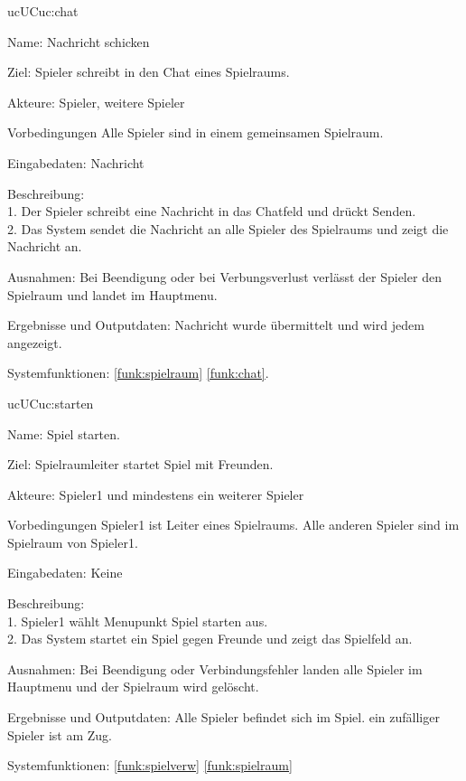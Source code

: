 \begin{description}[leftmargin=5em, style=sameline]
	\begin{lhp}{uc}{UC}{uc:chat}
		\item [Name:] Nachricht schicken
		\item [Ziel:] Spieler schreibt in den Chat eines Spielraums.
		\item [Akteure:] Spieler, weitere Spieler
		\item [Vorbedingungen] Alle Spieler sind in einem gemeinsamen Spielraum.
		\item [Eingabedaten:] Nachricht
		\item [Beschreibung:] \hfill\\
			1. Der Spieler schreibt eine Nachricht in das Chatfeld und drückt Senden.\\
			2. Das System sendet die Nachricht an alle Spieler des Spielraums und zeigt die Nachricht an.\\
		\item [Ausnahmen:] Bei Beendigung oder bei Verbungsverlust verlässt der Spieler den Spielraum und landet im Hauptmenu.
		\item [Ergebnisse und Outputdaten:] Nachricht wurde übermittelt und wird jedem angezeigt.
		\item [Systemfunktionen:] \ref{funk:spielraum} \ref{funk:chat}.
	\end{lhp}

	\begin{lhp}{uc}{UC}{uc:starten}
		\item [Name:] Spiel starten.
		\item [Ziel:] Spielraumleiter startet Spiel mit Freunden.
		\item [Akteure:] Spieler1 und mindestens ein weiterer Spieler
		\item [Vorbedingungen] Spieler1 ist Leiter eines Spielraums. Alle anderen Spieler sind im Spielraum von Spieler1.
		\item [Eingabedaten:] Keine
		\item [Beschreibung:] \hfill\\
				1. Spieler1 wählt Menupunkt Spiel starten aus.\\
				2. Das System startet ein Spiel gegen Freunde und zeigt das Spielfeld an.
		\item [Ausnahmen:] Bei Beendigung oder Verbindungsfehler landen alle Spieler im Hauptmenu und der Spielraum wird gelöscht.
		\item [Ergebnisse und Outputdaten:] Alle Spieler befindet sich im Spiel. ein zufälliger Spieler ist am Zug.
		\item [Systemfunktionen:] \ref{funk:spielverw} \ref{funk:spielraum}
	\end{lhp}


\end{description}
